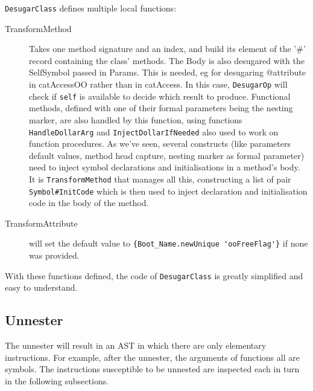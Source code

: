 \documentclass[a4paper]{memoir}
\begin{document}
\lstinline!DesugarClass! defines multiple local functions:
\begin{description}
  \item[TransformMethod] Takes one method signature and an index, and build its
    element of the '\#' record containing the class' methods. The Body is also desugared with the SelfSymbol passed in Params.
    This is needed, eg for desugaring @attribute in catAccessOO rather than in
    catAccess. In this case, \lstinline!DesugarOp! will check if
    \lstinline!self! is available to decide which result to produce.
    Functional methods, defined with one of their formal parameters being the
    nesting marker, are also handled by this function, using functions
    \lstinline!HandleDollarArg! and \lstinline!InjectDollarIfNeeded! also used
    to work on function procedures.
    As we've seen, several constructs (like parameters default values, method head capture, nesting marker
    as formal parameter) need to inject symbol declarations and initialisations
    in a method's body. It is \lstinline!TransformMethod! that manages all this,
    constructing a list of pair \lstinline!Symbol#InitCode! which is then used
    to inject declaration and initialisation code in the body of the method.
  \item[TransformAttribute] will set the default value to 
    \lstinline!{Boot_Name.newUnique 'ooFreeFlag'}! if none was provided.
\end{description}
With these functions defined, the code of \lstinline!DesugarClass! is greatly
simplified and easy to understand.

\subsection{Unnester}\label{sec:arch:unnester}
The unnester will result in an AST in which there are only elementary
instructions. For example, after the unnester, the arguments of functions all
are symbols. The instructions susceptible to be unnested are inspected each in turn in the following subsections.
\end{document}
